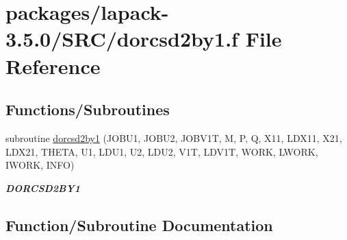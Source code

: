 \hypertarget{dorcsd2by1_8f}{}\section{packages/lapack-\/3.5.0/\+S\+R\+C/dorcsd2by1.f File Reference}
\label{dorcsd2by1_8f}
\subsection*{Functions/\+Subroutines}
\begin{DoxyCompactItemize}
\item 
subroutine \hyperlink{dorcsd2by1_8f_ae1a7eecbb70baaeb096a481052750f63}{dorcsd2by1} (J\+O\+B\+U1, J\+O\+B\+U2, J\+O\+B\+V1\+T, M, P, Q, X11, L\+D\+X11, X21, L\+D\+X21, T\+H\+E\+T\+A, U1, L\+D\+U1, U2, L\+D\+U2, V1\+T, L\+D\+V1\+T, W\+O\+R\+K, L\+W\+O\+R\+K, I\+W\+O\+R\+K, I\+N\+F\+O)
\begin{DoxyCompactList}\small\item\em {\bfseries D\+O\+R\+C\+S\+D2\+B\+Y1} \end{DoxyCompactList}\end{DoxyCompactItemize}


\subsection{Function/\+Subroutine Documentation}
\hypertarget{dorcsd2by1_8f_ae1a7eecbb70baaeb096a481052750f63}{}
